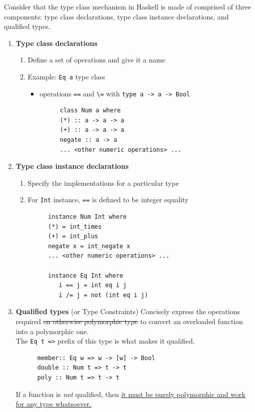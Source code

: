 Consider that the type class mechanism in Haskell is made of comprised of three components: type class
declarations, type class instance declarations, and qualified types.
\begin{enumerate}
   \item \textbf{Type class declarations}
   \begin{enumerate}
      \item Define a set of operations and give it a name
      \item Example: \lstinline|Eq a| type class
      \begin{itemize}
      	\item operations \lstinline|==| and \lstinline|\=| with \lstinline|type a -> a -> Bool|
      \end{itemize}
      \begin{lstlisting}
         class Num a where
         (*) :: a -> a -> a
         (+) :: a -> a -> a
         negate :: a -> a
         ... <other numeric operations> ...
      \end{lstlisting}
   \end{enumerate}
   \item \textbf{Type class instance declarations}
   \begin{enumerate}
      \item Specify the implementations for a particular type
      \item For \lstinline|Int| instance, \lstinline|==| is defined to be integer equality
   \end{enumerate}
   \begin{lstlisting}
         instance Num Int where
         (*) = int_times
         (+) = int_plus
         negate x = int_negate x
         ... <other numeric operations> ...

         instance Eq Int where
            i == j = int eq i j
            i /= j = not (int eq i j)
   \end{lstlisting}
   \item \textbf{Qualified types} (or Type Constraints)
   Concisely express the operations required \st{on otherwise polymorphic type} to convert an overloaded
   function into a polymorphic one.\\
   The \lstinline|Eq t =>| prefix of this type is what makes it qualified.
   \begin{lstlisting}
      member:: Eq w => w -> [w] -> Bool
      double :: Num t => t -> t
      poly :: Num t => t -> t
   \end{lstlisting}
   If a function is \textit{not} qualified, then \ul{it must be purely polymorphic and work for any type whatsoever.}
\end{enumerate}

